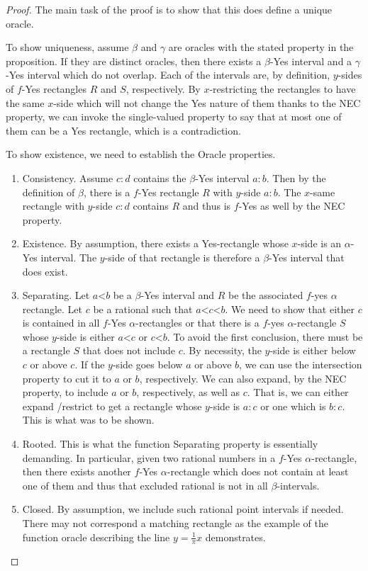 \documentclass[12pt]{article}
\theoremstyle{remark}
\newcommand{\lt}{\mathord{<}}
\begin{document}
\begin{proof}
The main task of the proof is to show that this does define a unique oracle.

To show uniqueness, assume $\beta$ and $\gamma$ are oracles with the stated property in the proposition. If they are distinct oracles, then there exists a $\beta$-Yes interval and a  $\gamma$-Yes interval which do not overlap. Each of the intervals are, by definition, $y$-sides of $f$-Yes rectangles $R$ and $S$, respectively. By $x$-restricting the rectangles to have the same $x$-side which will not change the Yes nature of them thanks to the NEC property, we can invoke the single-valued property to say that at most one of them can be a Yes rectangle, which is a contradiction. 

To show existence, we need to establish the Oracle properties. 

\begin{enumerate}
    \item Consistency. Assume $c:d$ contains the $\beta$-Yes interval $a:b$. Then by the definition of $\beta$, there is a $f$-Yes rectangle $R$ with $y$-side $a:b$. The $x$-same rectangle with $y$-side $c:d$ contains $R$ and thus is $f$-Yes as well by the NEC property. 
    \item Existence. By assumption, there exists a Yes-rectangle whose $x$-side is an $\alpha$-Yes interval. The $y$-side of that rectangle is therefore a $\beta$-Yes interval that does exist. 
    \item Separating. Let $a \lt b$ be a $\beta$-Yes interval and $R$ be the associated $f$-yes $\alpha$ rectangle. Let $c$ be a rational such that $a \lt c \lt b$. We need to show that either $c$ is contained in all $f$-Yes $\alpha$-rectangles or that there is a $f$-yes $\alpha$-rectangle $S$ whose $y$-side is either $a \lt c$ or $c \lt b$. To avoid the first conclusion, there must be a rectangle $S$ that does not include $c$. By necessity, the $y$-side is either below $c$ or above $c$. If the $y$-side goes below $a$ or above $b$, we can use the intersection property to cut it to $a$ or $b$, respectively. We can also expand, by the NEC property, to include $a$ or $b$, respectively, as well as $c$. That is, we can either expand /restrict to get a rectangle whose $y$-side is $a:c$ or one which is $b:c$. This is what was to be shown. 
    \item Rooted. This is what the function Separating property is essentially demanding. In particular, given two rational numbers in a $f$-Yes $\alpha$-rectangle, then there exists another $f$-Yes $\alpha$-rectangle which does not contain at least one of them and thus that excluded rational is not in all $\beta$-intervals. 
    \item Closed. By assumption, we include such rational point intervals if needed. There may not correspond a matching rectangle as the example of the function oracle describing the line $y = \frac{1}{\pi} x$ demonstrates.  
\end{enumerate}

\end{proof}
\end{document}
